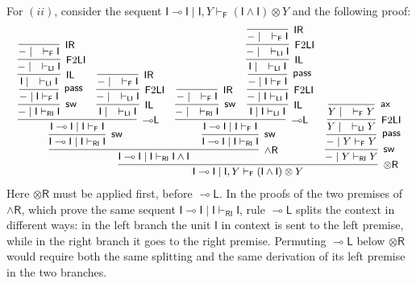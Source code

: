 \documentclass[submission,copyright,creativecommons]{eptcs}
\theoremstyle{definition}
\newcommand{\tr}{\otimes \mathsf{R}}
\newcommand{\lleft}{{\multimap}\mathsf{L}}
\newcommand{\pass}{\mathsf{pass}}
\newcommand{\unitl}{\mathsf{IL}}
\newcommand{\unitr}{\mathsf{IR}}
\newcommand{\andr}{\land \mathsf{R}}
\newcommand{\ax}{\mathsf{ax}}
\newcommand{\ot}{\otimes}
\newcommand{\lolli}{\multimap}
\newcommand{\I}{\mathsf{I}}
\newcommand{\RI}{\mathsf{RI}}
\newcommand{\LI}{\mathsf{LI}}
\newcommand{\F}{\mathsf{F}}
\newcommand{\sw}{\mathsf{sw}}
\begin{document}
For $(ii)$, consider the sequent $\I \lolli \I \mid \I , Y \vdash_\F (\I \land \I) \ot Y$ and the following proof:
\begin{equation}\label{eq:ex:lleft:NonDeter}
  \small
  \begin{array}{c}
    \infer[\tr]{\I \lolli \I \mid \I , Y \vdash_\F (\I \land \I) \ot Y}{
      \infer[\andr]{\I \lolli \I \mid \I \vdash_\RI \I \land \I}{
  \infer[\sw]{\I \lolli \I \mid \I \vdash_\RI \I}{
    \infer[\lleft]{\I \lolli \I \mid \I \vdash_\F \I}{
      \infer[\sw]{- \mid \I \vdash_\RI \I}{
      \infer[\pass]{- \mid \I \vdash_\F \I}{
        \infer[\unitl]{\I \mid \quad \vdash_\LI \I}{
          \infer[\F 2 \LI]{- \mid \quad \vdash_\LI \I}{
          \infer[\unitr]{- \mid \quad \vdash_\F \I}{}}
        }
      }}
      &
      \infer[\unitl]{\I \mid \quad \vdash_\LI \I}{
        \infer[\F 2 \LI]{- \mid \quad \vdash_\LI \I}{
        \infer[\unitr]{- \mid \quad \vdash_\F \I}{}
      }}
    }
      }        
    &
   \infer[\sw]{\I \lolli \I \mid \I \vdash_\RI \I}{
        \infer[\lleft]{\I \lolli \I \mid \I \vdash_\F \I}{
      \infer[\sw]{- \mid \quad \vdash_\RI \I}{
      \infer[\unitr]{- \mid \quad \vdash_\F \I}{}}
      &
      \infer[\unitl]{\I \mid \I \vdash_\LI \I}{
        \infer[\F 2 \LI]{- \mid \I \vdash_\LI \I}{
        \infer[\pass]{- \mid \I \vdash_\F \I}{
          \infer[\unitl]{\I \mid \quad \vdash_\LI \I}{
            \infer[\F 2 \LI]{- \mid \quad \vdash_\LI \I}{
            \infer[\unitr]{- \mid \quad \vdash_\F \I}{}}
          }
        }
      }
    }}}}    
      &
      \infer[\sw]{- \mid Y \vdash_\RI Y}{
      \infer[\pass]{- \mid Y \vdash_\F Y}{
        \infer[\F 2 \LI]{Y \mid \quad \vdash_\LI Y}{
        \infer[\ax]{Y \mid \quad \vdash_\F Y}{}}
      }}
    }
  \end{array}
\end{equation}
Here $\tr$ must be applied first, before $\lleft$. In the proofs of the two premises of $\andr$, which prove the same sequent $\I \lolli \I \mid \I \vdash_\RI \I$, rule $\lleft$ splits the context in different ways: in the left branch the unit $\I$ in context is sent to the left premise, while in the right branch it goes to the right premise. Permuting $\lleft$ below $\tr$ would require both the same splitting and the same derivation of its left premise in the two branches.
\end{document}
